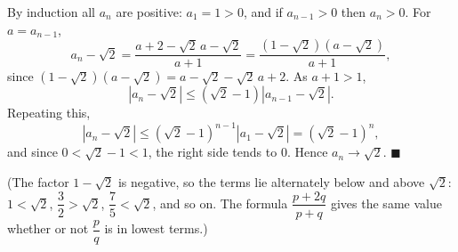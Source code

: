 By induction all $a_n$ are positive: $a_1=1>0$, and if $a_{n-1}>0$ then $a_n>0$. For $a=a_{n-1}$,
\[
a_n-\sqrt2=\dfrac{a+2-\sqrt2\,a-\sqrt2}{a+1}=\dfrac{(1-\sqrt2)(a-\sqrt2)}{a+1},
\]
since $(1-\sqrt2)(a-\sqrt2)=a-\sqrt2-\sqrt2\,a+2$. As $a+1>1$,
\[
\left|a_n-\sqrt2\right|\le(\sqrt2-1)\left|a_{n-1}-\sqrt2\right| .
\]
Repeating this,
\[
\left|a_n-\sqrt2\right|\le(\sqrt2-1)^{n-1}\left|a_1-\sqrt2\right|=(\sqrt2-1)^{n},
\]
and since $0<\sqrt2-1<1$, the right side tends to $0$. Hence $a_n\to\sqrt2$. $\blacksquare$

(The factor $1-\sqrt2$ is negative, so the terms lie alternately below and above $\sqrt2$: $1<\sqrt2$, $\dfrac{3}{2}>\sqrt2$, $\dfrac{7}{5}<\sqrt2$, and so on. The formula $\dfrac{p+2q}{p+q}$ gives the same value whether or not $\dfrac {p}{q}$ is in lowest terms.)
